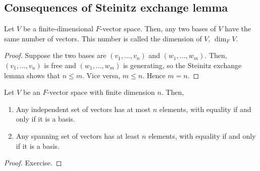 \subsection{Consequences of Steinitz exchange lemma}
\begin{corollary}
    Let $V$ be a finite-dimensional $F$-vector space.
    Then, any two bases of $V$ have the same number of vectors.
    This number is called the dimension of $V$, $\dim_F V$.
\end{corollary}
\begin{proof}
    Suppose the two bases are $(v_1, \dots, v_n)$ and $(w_1, \dots, w_m)$.
    Then, $(v_1, \dots, v_n)$ is free and $(w_1, \dots, w_m)$ is generating, so the Steinitz exchange lemma shows that $n \leq m$.
    Vice versa, $m \leq n$.
    Hence $m = n$.
\end{proof}
\begin{corollary}
    Let $V$ be an $F$-vector space with finite dimension $n$.
    Then,
    \begin{enumerate}
        \item Any independent set of vectors has at most $n$ elements, with equality if and only if it is a basis.
        \item Any spanning set of vectors has at least $n$ elements, with equality if and only if it is a basis.
    \end{enumerate}
\end{corollary}
\begin{proof}
    Exercise.
\end{proof}


